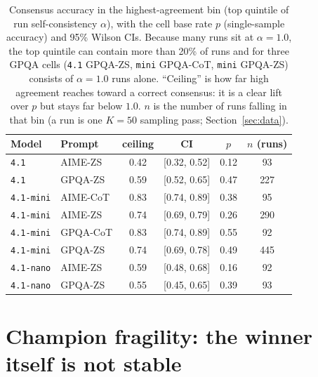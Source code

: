\documentclass{article}
\begin{document}
\begin{table}[H]
\centering
\caption{Consensus accuracy in the highest-agreement bin (top quintile
of run self-consistency $\alpha$), with the cell
base rate $p$ (single-sample accuracy) and 95\% Wilson CIs. Because many
runs sit at $\alpha=1.0$, the top quintile can contain more than 20\% of
runs and for three GPQA cells (\texttt{4.1} GPQA-ZS, \texttt{mini} GPQA-CoT, \texttt{mini} GPQA-ZS) consists of $\alpha=1.0$ runs alone.
``Ceiling'' is how far high agreement reaches toward a correct consensus: it is a clear lift over
$p$ but stays far below $1.0$. $n$ is the number of runs
falling in that bin (a run is one $K=50$ sampling pass;
Section~\ref{sec:data}).}
\label{tab:ceiling}
\begin{tabular}{llcccc}
\toprule
Model & Prompt & ceiling & CI & $p$ & $n$ (runs) \\
\midrule
\texttt{4.1} & AIME-ZS & 0.42 & [0.32, 0.52] & 0.12 & 93 \\
\texttt{4.1} & GPQA-ZS & 0.59 & [0.52, 0.65] & 0.47 & 227 \\
\texttt{4.1-mini} & AIME-CoT & 0.83 & [0.74, 0.89] & 0.38 & 95 \\
\texttt{4.1-mini} & AIME-ZS & 0.74 & [0.69, 0.79] & 0.26 & 290 \\
\texttt{4.1-mini} & GPQA-CoT & 0.83 & [0.74, 0.89] & 0.55 & 92 \\
\texttt{4.1-mini} & GPQA-ZS & 0.74 & [0.69, 0.78] & 0.49 & 445 \\
\texttt{4.1-nano} & AIME-ZS & 0.59 & [0.48, 0.68] & 0.16 & 92 \\
\texttt{4.1-nano} & GPQA-ZS & 0.55 & [0.45, 0.65] & 0.39 & 93 \\
\bottomrule
\end{tabular}
\end{table}

\section{Champion fragility: the winner itself is not stable}
\label{app:fragility}
\end{document}
